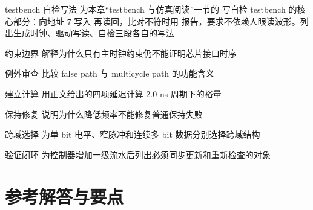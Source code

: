 \begin{chapterexercise}{testbench 自检写法}
为本章“testbench 与仿真阅读”一节的  写自检 testbench 的核心部分：向地址 7 写入  再读回，比对不符时用  报告，要求不依赖人眼读波形。列出生成时钟、驱动写读、自检三段各自的写法
\end{chapterexercise}

\begin{chapterexercise}{约束边界}
解释为什么只有主时钟约束仍不能证明芯片接口时序
\end{chapterexercise}

\begin{chapterexercise}{例外审查}
比较 false path 与 multicycle path 的功能含义
\end{chapterexercise}

\begin{chapterexercise}{建立计算}
用正文给出的四项延迟计算 2.0 ns 周期下的裕量
\end{chapterexercise}

\begin{chapterexercise}{保持修复}
说明为什么降低频率不能修复普通保持失败
\end{chapterexercise}

\begin{chapterexercise}{跨域选择}
为单 bit 电平、窄脉冲和连续多 bit 数据分别选择跨域结构
\end{chapterexercise}

\begin{chapterexercise}{验证闭环}
为控制器增加一级流水后列出必须同步更新和重新检查的对象
\end{chapterexercise}

\section*{参考解答与要点}

